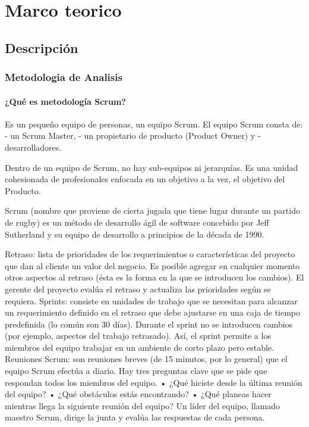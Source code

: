 \documentclass[spanish,12pt]{article}
\begin{document}
\section{Marco teorico}\label{marco-teorico}

\subsection{Descripción}\label{descripciuxf3n}

\subsubsection{Metodologia de Analisis}\label{metodologia-de-analisis}

\paragraph{¿Qué es metodología
Scrum?}\label{quuxe9-es-metodologuxeda-scrum}

Es un pequeño equipo de personas, un equipo Scrum. El equipo Scrum
consta de: - un Scrum Master, - un propietario de producto (Product
Owner) y - desarrolladores.

Dentro de un equipo de Scrum, no hay sub-equipos ni jerarquías. Es una
unidad cohesionada de profesionales enfocada en un objetivo a la vez, el
objetivo del Producto.

Scrum (nombre que proviene de cierta jugada que tiene lugar durante un
partido de rugby) es un método de desarrollo ágil de software concebido
por Jeff Sutherland y su equipo de desarrollo a principios de la década
de 1990.

Retraso: lista de prioridades de los requerimientos o características
del proyecto que dan al cliente un valor del negocio. Es posible agregar
en cualquier momento otros aspectos al retraso (ésta es la forma en la
que se introducen los cambios). El gerente del proyecto evalúa el
retraso y actualiza las prioridades según se requiera. Sprints: consiste
en unidades de trabajo que se necesitan para alcanzar un requerimiento
definido en el retraso que debe ajustarse en una caja de tiempo
predefinida (lo común son 30 días). Durante el sprint no se introducen
cambios (por ejemplo, aspectos del trabajo retrasado). Así, el sprint
permite a los miembros del equipo trabajar en un ambiente de corto plazo
pero estable. Reuniones Scrum: son reuniones breves (de 15 minutos, por
lo general) que el equipo Scrum efectúa a diario. Hay tres preguntas
clave que se pide que respondan todos los miembros del equipo. • ¿Qué
hiciste desde la última reunión del equipo? • ¿Qué obstáculos estás
encontrando? • ¿Qué planeas hacer mientras llega la siguiente reunión
del equipo? Un líder del equipo, llamado maestro Scrum, dirige la junta
y evalúa las respuestas de cada persona.
\end{document}
